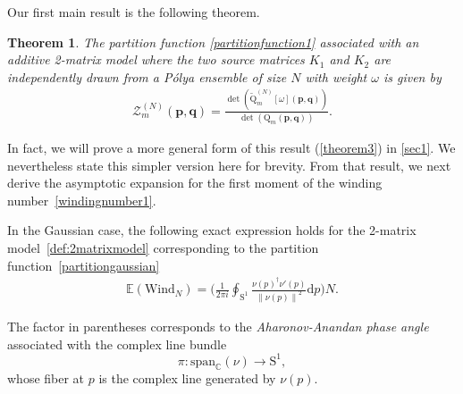 \documentclass[pdflatex,sn-mathphys-num]{sn-jnl}
\theoremstyle{thmstyleone}
\newtheorem{theorem}{Theorem}[section]
\numberwithin{equation}{section}
\newcommand{\Sp}{\mathrm{S}^{1}}
\newcommand{\C}{\mathbb{C}}
\begin{document}
Our first main result is the following theorem.
\begin{theorem}\label{theorem1}
The partition function \eqref{partitionfunction1} associated with an additive 2-matrix model where the two source matrices $K_{1}$ and $K_{2}$ are independently drawn from a Pólya ensemble of size $N$ with weight $\omega$ is given by
    \begin{align}
            \mathscr{Z}^{\left(N\right)}_{m}\left ( \mathbf{p},\mathbf{q} \right )=\frac{\det\left ( \widetilde{\mathrm{Q}}^{(N)}_{m}[\omega](\mathbf{p}, \mathbf{q})\right)}{\det\left ( \mathrm{Q}_{m}\left ( \mathbf{p},\mathbf{q} \right ) \right )}.
        \end{align}
\end{theorem}

In fact, we will prove a more general form of this result (\autoref{theorem3}) in \autoref{sec1}. We nevertheless state this simpler version here for brevity. From that result, we next derive the asymptotic expansion for the first moment of the winding number~\eqref{windingnumber1}.
 
In the Gaussian case, the following exact expression holds for the 2-matrix model~\eqref{def:2matrixmodel} corresponding to the partition function~\eqref{partitiongaussian}
\begin{align}\label{asymptoticwinding1}
    \mathbb{E}\left(\mathrm{Wind}_{N} \right)=\Bigg(\frac{1}{2\pi i}\oint_{\mathrm{S}^{1}}^{}\frac{\nu\left( p \right)^{\dagger}\nu'\left( p \right)}{\left\| \nu\left( p \right) \right\|^{2}}\mathrm{d}p\Bigg)N.
\end{align}
 
The factor in parentheses corresponds to the \textit{Aharonov-Anandan phase angle} associated with the complex line bundle
\begin{equation}
    \pi:\mathrm{span}_{\C}(\nu)\to \Sp,
\end{equation}
whose fiber at $p$ is the complex line generated by $\nu(p)$. 
\end{document}
